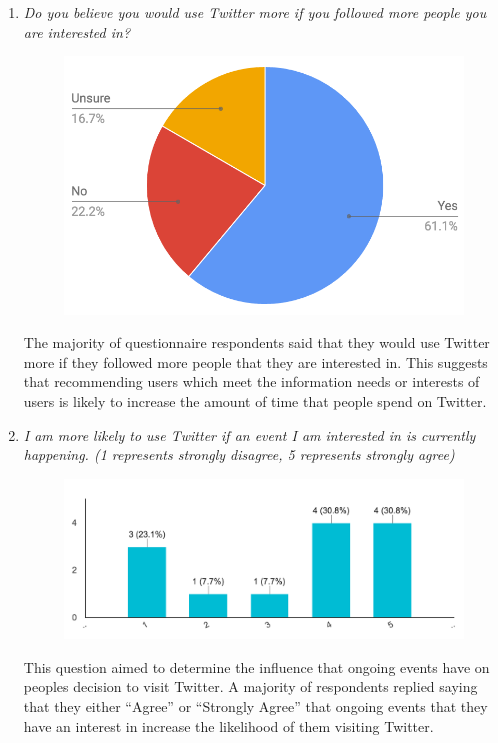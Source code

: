 \documentclass{l4proj}
\begin{document}
\begin{enumerate}
\item \textit{Do you believe you would use Twitter more if you followed more people you are interested in?}
\par
\begin{figure}[H]
\centering
\includegraphics[scale=0.55]{usetwittermore.png}
\label{usetwittermore}
\end{figure}
The majority of questionnaire respondents said that they would use Twitter more if they followed more people that they are interested in. This suggests that recommending users which meet the information needs or interests of users is likely to increase the amount of time that people spend on Twitter.

\item \textit{I am more likely to use Twitter if an event I am interested in is currently happening. (1 represents strongly disagree, 5 represents strongly agree)}
\par
\begin{figure}[H]
\centering
\includegraphics[scale=0.55]{morelikelytwitter.png}
\label{morelikelytwitter}
\end{figure}
This question aimed to determine the influence that ongoing events have on peoples decision to visit Twitter. A majority of respondents replied saying that they either ``Agree'' or ``Strongly Agree'' that ongoing events that they have an interest in increase the likelihood of them visiting Twitter.



\end{enumerate}
\end{document}

